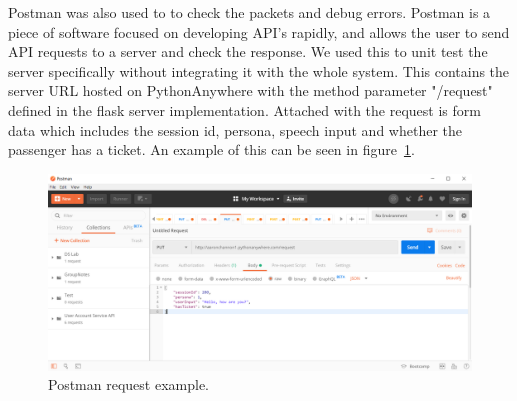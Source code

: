 Postman was also used to to check the packets and debug errors. Postman is a piece of software focused on developing API's rapidly, and allows the user to send API requests to a server and check the response. We used this to unit test the server specifically without integrating it with the whole system. This contains the server URL hosted on PythonAnywhere with the method parameter "/request" defined in the flask server implementation. Attached with the request is form data which includes the session id, persona, speech input and whether the passenger has a ticket. An example of this can be seen in figure~\ref{image:postman}. 

\begin{figure}[ht]
	\caption{Postman request example.}
	\label{image:postman}
	\centering
	\includegraphics[width=1\textwidth]{Images/postman.PNG}
\end{figure}

\newpage

